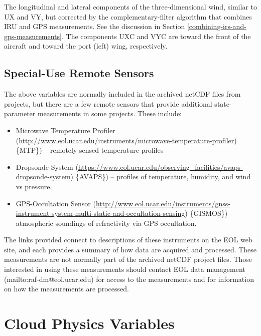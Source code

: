 \documentclass[
  english,
]{book}
\providecommand{\tightlist}{%
  \setlength{\itemsep}{0pt}\setlength{\parskip}{0pt}}
\begin{document}
The longitudinal and lateral components of the three-dimensional wind, similar to UX and VY, but corrected by the complementary-filter algorithm that combines IRU and GPS measurements. See the discussion in Section \ref{combining-irs-and-gps-measurements}. The components UXC and VYC are toward the front of the aircraft and toward the port (left) wing, respectively.

\hypertarget{special-use-remote}{%
\section{Special-Use Remote Sensors}\label{special-use-remote}}

The above variables are normally included in the archived netCDF files from projects, but there are a few remote sensors that provide additional state-parameter measurements in some projects. These include:\protect\hypertarget{subsec:MTP}{}{}

\begin{itemize}
\tightlist
\item
  Microwave Temperature Profiler (\url{http://www.eol.ucar.edu/instruments/microwave-temperature-profiler}) \{MTP\})
  -- remotely sensed temperature profiles\\
\item
  Dropsonde System (\url{https://www.eol.ucar.edu/observing_facilities/avaps-dropsonde-system}) \{AVAPS\})
  -- profiles of temperature, humidity, and wind vs pressure.\\
\item
  GPS-Occultation Sensor (\url{http://www.eol.ucar.edu/instruments/gnss-instrument-system-multi-static-and-occultation-sensing}) \{GISMOS\})
  -- atmospheric soundings of refractivity via GPS occultation.
\end{itemize}

The links provided connect to descriptions of these instruments on the EOL web site, and each provides a summary of how data are acquired and processed. These measurements are not normally part of the archived netCDF project files. Those interested in using these measurements should contact EOL data management (mailto:raf-dm@eol.ucar.edu) for access to the measurements and for information on how the measurements are processed.

\hypertarget{cloud-physics-variables}{%
\chapter{Cloud Physics Variables}\label{cloud-physics-variables}}
\end{document}
